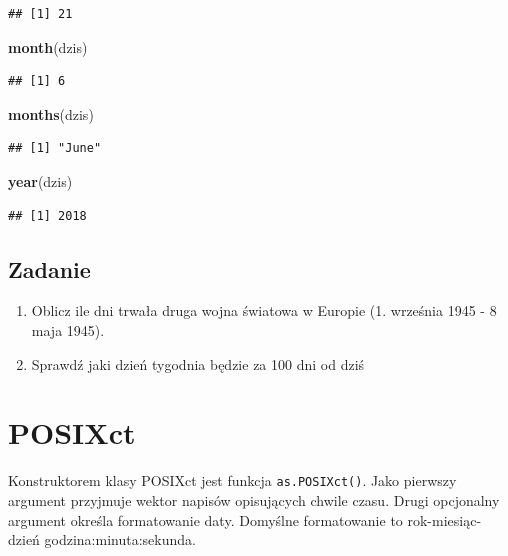 \documentclass[]{book}
\newenvironment{Shaded}{\begin{snugshade}}{\end{snugshade}}
\newcommand{\KeywordTok}[1]{\textcolor[rgb]{0.13,0.29,0.53}{\textbf{#1}}}
\newcommand{\NormalTok}[1]{#1}
\providecommand{\tightlist}{%
  \setlength{\itemsep}{0pt}\setlength{\parskip}{0pt}}
\theoremstyle{definition}
\theoremstyle{definition}
\theoremstyle{definition}
\theoremstyle{remark}
\begin{document}
\begin{verbatim}
## [1] 21
\end{verbatim}

\begin{Shaded}
\begin{Highlighting}[]
\KeywordTok{month}\NormalTok{(dzis)}
\end{Highlighting}
\end{Shaded}

\begin{verbatim}
## [1] 6
\end{verbatim}

\begin{Shaded}
\begin{Highlighting}[]
\KeywordTok{months}\NormalTok{(dzis)}
\end{Highlighting}
\end{Shaded}

\begin{verbatim}
## [1] "June"
\end{verbatim}

\begin{Shaded}
\begin{Highlighting}[]
\KeywordTok{year}\NormalTok{(dzis)}
\end{Highlighting}
\end{Shaded}

\begin{verbatim}
## [1] 2018
\end{verbatim}

\subsection*{Zadanie}\label{zadanie}

\begin{enumerate}
\def\labelenumi{\arabic{enumi}.}
\tightlist
\item
  Oblicz ile dni trwała druga wojna światowa w Europie (1. września 1945
  - 8 maja 1945).
\item
  Sprawdź jaki dzień tygodnia będzie za 100 dni od dziś
\end{enumerate}

\section{POSIXct}\label{posixct}

Konstruktorem klasy POSIXct jest funkcja \texttt{as.POSIXct()}. Jako
pierwszy argument przyjmuje wektor napisów opisujących chwile czasu.
Drugi opcjonalny argument określa formatowanie daty. Domyślne
formatowanie to rok-miesiąc-dzień godzina:minuta:sekunda.
\end{document}
